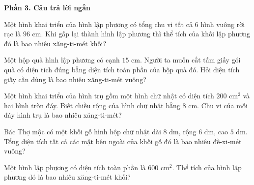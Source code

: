 \textbf{Phần 3. Câu trả lời ngắn}

\begin{ex} %
Một hình khai triển của hình lập phương có tổng chu vi tất cả $6$ hình vuông rời rạc là $96\text{ cm}$. Khi gấp lại thành hình lập phương thì thể tích của khối lập phương đó là bao nhiêu xăng-ti-mét khối?
\end{ex}

\begin{ex} %
Một hộp quà hình lập phương có cạnh $15\text{ cm}$. Người ta muốn cắt tấm giấy gói quà có diện tích đúng bằng diện tích toàn phần của hộp quà đó. Hỏi diện tích giấy cần dùng là bao nhiêu xăng-ti-mét vuông?
\end{ex}

\begin{ex} %
Một hình khai triển của hình trụ gồm một hình chữ nhật có diện tích $200\text{ cm}^2$ và hai hình tròn đáy. Biết chiều rộng của hình chữ nhật bằng $8\text{ cm}$. Chu vi của mỗi đáy hình trụ là bao nhiêu xăng-ti-mét?
\end{ex}

\begin{ex} %
Bác Thợ mộc có một khối gỗ hình hộp chữ nhật dài $8\text{ dm}$, rộng $6\text{ dm}$, cao $5\text{ dm}$. Tổng diện tích tất cả các mặt bên ngoài của khối gỗ đó là bao nhiêu đề-xi-mét vuông?
\end{ex}

\begin{ex} %
Một hình lập phương có diện tích toàn phần là $600\text{ cm}^2$. Thể tích của hình lập phương đó là bao nhiêu xăng-ti-mét khối?
\end{ex}

